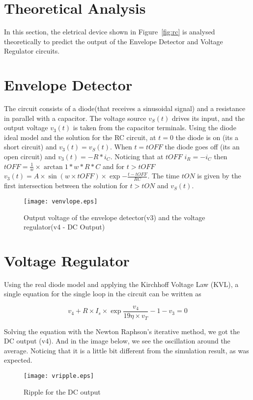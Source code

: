 \section{Theoretical Analysis}
\label{sec:analysis}

In this section, the eletrical device shown in Figure~\ref{fig:rc} is analysed
theoretically to predict the output of the Envelope Detector and Voltage Regulator circuits.

\section{Envelope Detector}

The circuit consists of a diode(that receives a sinusoidal signal) and a resistance in parallel with a capacitor. The
voltage source $v_S(t)$ drives its input, and the output voltage $v_3(t)$ is taken from
the capacitor terminals. Using the diode ideal model and the solution for the RC circuit, at $t=0$ the diode is on (its a short circuit) and $v_3(t)=v_S(t)$. When $t=tOFF$ the diode goes off (its an open circuit) and $v_3(t)=-R*i_{C}$.
Noticing that at $tOFF$ $i_{R}=-i_{C}$ then $tOFF = \frac{1}{w} \times \arctan{1*w*R*C}$ and for $t>tOFF$ $v_3(t)= A\times \sin(w\times tOFF)\times \exp{-\frac{t-tOFF}{RC}}$.
The time $tON$ is given by the first intersection between the solution for $t>tON$ and $v_S(t)$.

\begin{figure}[h] \centering
\texttt{[image: venvlope.eps]}
\caption{Output voltage of the envelope detector(v3) and the voltage regulator(v4 - DC Output)}
\label{fig:vevelope}
\end{figure}
\newpage
\section{Voltage Regulator}
Using the real diode model and applying the Kirchhoff Voltage Law (KVL), a single
equation for the single loop in the circuit can be written as

\begin{equation}
  v_{4}+R\times I_{s} \times \exp{\frac{v_{4}}{19\eta \times v_{T}}-1} - v_{3}=0
  \label{eq:kvl}
\end{equation}

Solving the equation with the Newton Raphson’s iterative method, we got the DC output (v4). And in the image below, we see the oscillation around the average. Noticing that it is a little bit different from the simulation result, as was expected.

\begin{figure}[h] \centering
\texttt{[image: vripple.eps]}
\caption{Ripple for the DC output}
\label{fig:vripple}
\end{figure}

